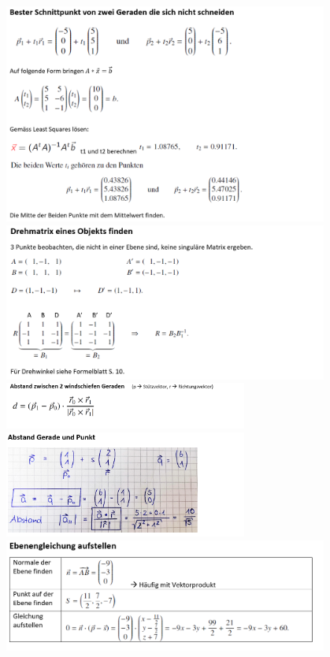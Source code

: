 \includegraphics[width=0.8\textwidth]{pics/bsp_1.png}\\
\includegraphics[width=0.8\textwidth]{pics/bsp_2.png}\\
\includegraphics[width=0.6\textwidth]{pics/bsp_3.png}\\
\includegraphics[width=0.6\textwidth]{pics/bsp_4.png}\\
\includegraphics[width=0.8\textwidth]{pics/bsp_5.png}\\
